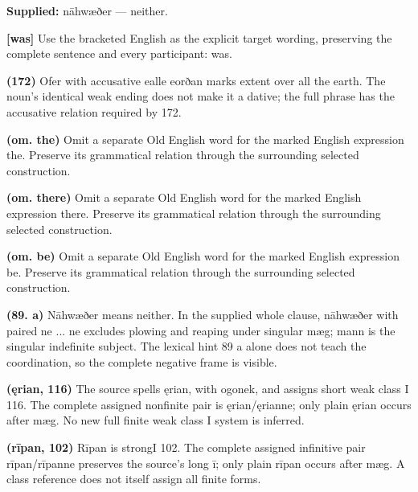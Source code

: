 \textbf{Supplied:} nāhwæðer — neither.

\textbf{[was]} Use the bracketed English as the explicit target wording, preserving the complete sentence and every participant: was.

\textbf{(172)} Ofer with accusative ealle eorðan marks extent over all the earth. The noun’s identical weak ending does not make it a dative; the full phrase has the accusative relation required by 172.

\textbf{(om. the)} Omit a separate Old English word for the marked English expression the. Preserve its grammatical relation through the surrounding selected construction.

\textbf{(om. there)} Omit a separate Old English word for the marked English expression there. Preserve its grammatical relation through the surrounding selected construction.

\textbf{(om. be)} Omit a separate Old English word for the marked English expression be. Preserve its grammatical relation through the surrounding selected construction.

\textbf{(89. a)} Nāhwæðer means neither. In the supplied whole clause, nāhwæðer with paired ne ... ne excludes plowing and reaping under singular mæg; mann is the singular indefinite subject. The lexical hint 89 a alone does not teach the coordination, so the complete negative frame is visible.

\textbf{(ęrian, 116)} The source spells ęrian, with ogonek, and assigns short weak class I 116. The complete assigned nonfinite pair is ęrian/\allowbreak{}ęrianne; only plain ęrian occurs after mæg. No new full finite weak class I system is inferred.

\textbf{(rīpan, 102)} Rīpan is strongI 102. The complete assigned infinitive pair rīpan/\allowbreak{}rīpanne preserves the source’s long ī; only plain rīpan occurs after mæg. A class reference does not itself assign all finite forms.

